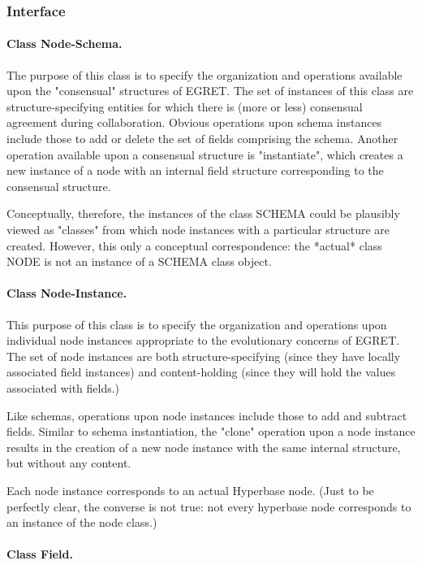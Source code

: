 \subsubsection{Interface}

\paragraph{Class Node-Schema.}

The purpose of this class is to specify the organization and
operations available upon the "consensual" structures of EGRET.  The
set of instances of this class are structure-specifying entities for
which there is (more or less) consensual agreement during
collaboration.  Obvious operations upon schema instances include those
to add or delete the set of fields comprising the schema. Another
operation available upon a consensual structure is "instantiate",
which creates a new instance of a node with an internal field
structure corresponding to the consensual structure.

Conceptually, therefore, the instances of the class SCHEMA could be
plausibly viewed as "classes" from which node instances with a
particular structure are created.  However, this only a conceptual
correspondence: the *actual* class NODE is not an instance of a SCHEMA
class object.


\paragraph {Class Node-Instance.}

This purpose of this class is to specify the organization and
operations upon individual node instances appropriate to the
evolutionary concerns of EGRET. The set of node instances are both
structure-specifying (since they have locally associated field
instances) and content-holding (since they will hold the values
associated with fields.)
  
Like schemas, operations upon node instances include those to add and
subtract fields.  Similar to schema instantiation, the "clone"
operation upon a node instance results in the creation of a new node
instance with the same internal structure, but without any content.

Each node instance corresponds to an actual Hyperbase node.
(Just to be perfectly clear, the converse is not true: not every
hyperbase node corresponds to an instance of the node class.)

\paragraph {Class Field.}

